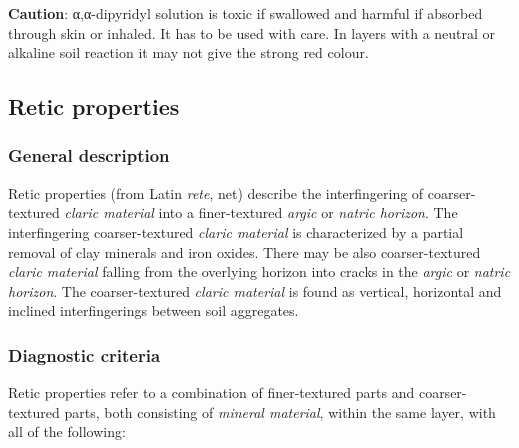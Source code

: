 \documentclass[
  letterpaper,
  DIV=11,
  numbers=noendperiod]{scrreprt}
\begin{document}
\textbf{Caution}: α,α-dipyridyl solution is toxic if swallowed and
harmful if absorbed through skin or inhaled. It has to be used with
care. In layers with a neutral or alkaline soil reaction it may not give
the strong red colour.

\hypertarget{retic-properties}{%
\subsection{Retic properties}\label{retic-properties}}

\hypertarget{general-description-48}{%
\subsubsection{General description}\label{general-description-48}}

Retic properties (from Latin \emph{rete}, net) describe the
interfingering of coarser-textured \emph{claric material} into a
finer-textured \emph{argic} or \emph{natric horizon}. The interfingering
coarser-textured \emph{claric material} is characterized by a partial
removal of clay minerals and iron oxides. There may be also
coarser-textured \emph{claric material} falling from the overlying
horizon into cracks in the \emph{argic} or \emph{natric horizon}. The
coarser-textured \emph{claric material} is found as vertical, horizontal
and inclined interfingerings between soil aggregates.

\hypertarget{diagnostic-criteria-50}{%
\subsubsection{Diagnostic criteria}\label{diagnostic-criteria-50}}

Retic properties refer to a combination of finer-textured parts and
coarser-textured parts, both consisting of \emph{mineral material},
within the same layer, with all of the following:
\end{document}
